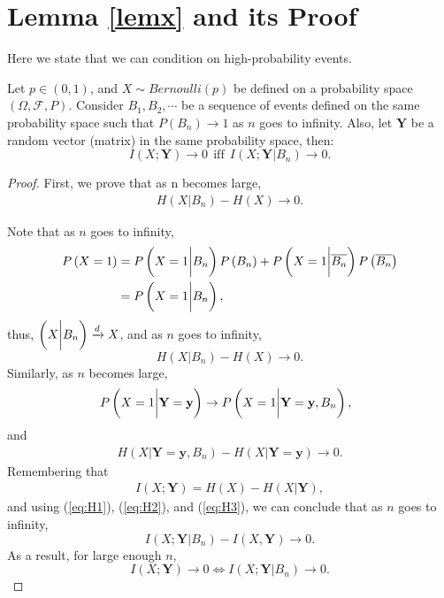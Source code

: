 \section{Lemma \ref{lemx} and its Proof}
\label{sec:app_a}
Here we state that we can condition on high-probability events.

\begin{lem}
	\label{lemx}
	Let $p \in (0,1)$, and $X \sim Bernoulli (p)$ be defined on a probability space $(\Omega, \mathcal{F}, P)$. Consider $B_1, B_2, \cdots $ be a sequence of events defined on the same probability space such that $P(B_n) \rightarrow 1$ as $n$ goes to infinity. Also, let $\textbf{Y}$ be a random vector (matrix) in the same probability space, then:
	\[I(X; \textbf{Y}) \rightarrow 0\ \ \text{iff}\ \  I(X; \textbf{Y} {|} B_n) \rightarrow 0. \]
\end{lem}

\begin{proof}
First, we prove that as n becomes large,
\begin{align}\label{eq:H1}
H(X {|} B_n)- H(X) \rightarrow 0.
\end{align}

Note that as $n$ goes to infinity,
\begin{align}
\nonumber P\left(X=1\right) &=P\left(X=1 \bigg{|} B_n\right) P\left(B_n\right) + P\left(X=1 \bigg{|} \overline{B_n}\right) P\left(\overline{B_n}\right)\\
\nonumber &=P\left(X=1 \bigg{|} B_n\right),\ \
\end{align}
thus,
$\left(X \bigg{|} B_n\right) \xrightarrow{d} X$, and as $n$ goes to infinity,
 \[H\left(X {|} B_n\right)- H(X) \rightarrow 0.\]
Similarly, as $n$ becomes large,
\[ P\left(X=1 \bigg{|} \textbf{Y}=\textbf{y}\right) \rightarrow P\left(X=1 \bigg{|} \textbf{Y}=\textbf{y}, B_n\right),\ \
\]
and
\begin{align}\label{eq:H2}
H\left(X {|}  \textbf{Y}=\textbf{y},B_n\right)- H\left(X {|} \textbf{Y}=\textbf{y}\right) \rightarrow 0.
\end{align}
Remembering that
\begin{align}\label{eq:H3}
I\left(X; \textbf{Y}\right)=H(X)-H(X {|} \textbf{Y}),
\end{align}
and using (\ref{eq:H1}), (\ref{eq:H2}), and (\ref{eq:H3}), we can conclude that as  $n$ goes to infinity,
\[I\left(X;\textbf{Y} {|} B_n\right) - I\left(X,\textbf{Y}\right) \rightarrow 0.\]
As a result, for large enough $n$,
\[I\left(X; \textbf{Y}\right) \rightarrow 0 \Longleftrightarrow I\left(X; \textbf{Y} {|} B_n\right) \rightarrow 0. \]
\end{proof}
